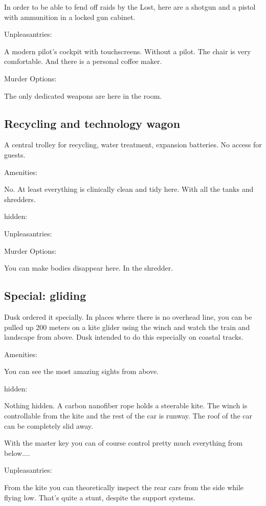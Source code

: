 \documentclass{book}
\begin{document}
In order to be able to fend off raids by the Lost, here are a shotgun and a pistol with ammunition in a locked gun cabinet.

Unpleasantries:

A modern pilot's cockpit with touchscreens. Without a pilot. The chair is very comfortable. And there is a personal coffee maker.

Murder Options:

The only dedicated weapons are here in the room.

\subsection{Recycling and technology wagon}


A central trolley for recycling, water treatment, expansion batteries.
No access for guests.

Amenities:

No. At least everything is clinically clean and tidy here. With all the tanks and shredders.

hidden:

Unpleasantries:

Murder Options:

You can make bodies disappear here. In the shredder.

\subsection{Special: gliding}


Dusk ordered it specially. In places where there is no overhead line, you can be pulled up 200 meters on a kite glider using the winch and watch the train and landscape from above.
Dusk intended to do this especially on coastal tracks.

Amenities:

You can see the most amazing sights from above.

hidden:

Nothing hidden. A carbon nanofiber rope holds a steerable kite. The winch is controllable from the kite and the rest of the car is runway. The roof of the car can be completely slid away.

With the master key you can of course control pretty much everything from below....

Unpleasantries:

From the kite you can theoretically inspect the rear cars from the side while flying low. That's quite a stunt, despite the support systems.
\end{document}
